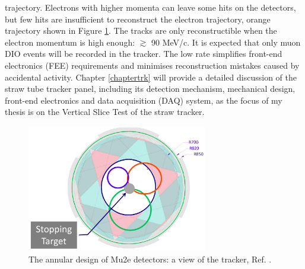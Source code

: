 trajectory. Electrons with higher momenta can leave some hits on the 
detectors, but few hits are insufficient to reconstruct the electron 
trajectory, orange trajectory shown in Figure \ref{fig:sttrk}. The tracks 
are only reconstructible when the electron momentum is high enough: $\gtrsim$ 
90 MeV/c. It is expected that only muon DIO events will be recorded in the 
tracker. The low rate simplifies front-end electronics (FEE) requirements 
and minimises reconstruction mistakes caused by accidental activity. 
Chapter \ref{chaptertrk} will provide a detailed discussion of the straw 
tube tracker panel, including its detection mechanism, mechanical design, 
front-end electronics and data acquisition (DAQ) system, as the focus of 
my thesis is on the Vertical Slice Test of the straw tracker.
\begin{figure}[!h]
\centering
\includegraphics[width =0.7\textwidth]{figures/png/Screenshot_20240306_214911.png}
\caption{The annular design of Mu2e detectors: a view of the tracker, Ref. \cite{trk}.}
\label{fig:sttrk}
\end{figure}
